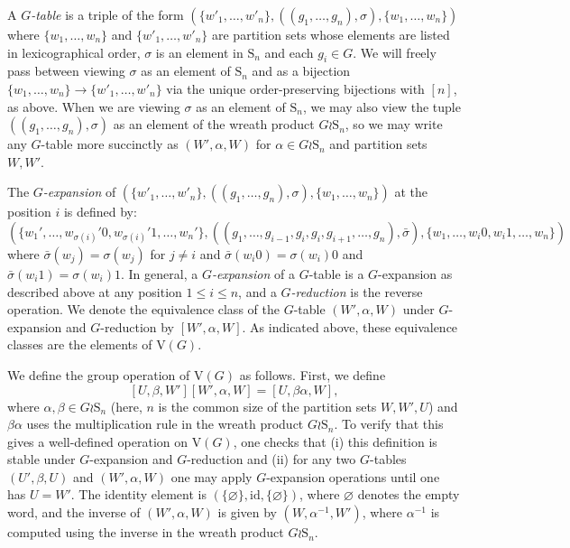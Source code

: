 \documentclass[10pt,a4paper]{amsart}
\numberwithin{equation}{section}
\numberwithin{figure}{section}
\theoremstyle{definition}
\newcommand{\V}{\mathrm{V}}
\renewcommand{\leq}{\leqslant}
\begin{document}
A \emph{$G$-table} is a triple of the form $(\{w'_1,\ldots, w'_n\} ,((g_1,\ldots,g_n),\sigma),\{w_1,\ldots,w_n\})$ where $\{w_1,\ldots,w_n\}$ and $\{w'_1,\ldots, w'_n\}$ are partition sets whose elements are listed in lexicographical order, $\sigma$ is an element in $\mathrm{S}_n$ and each $g_i \in G$. We will freely pass between viewing $\sigma$ as an element of $\mathrm{S}_n$ and as a bijection $\{w_1,\ldots,w_n\} \to \{w'_1,\ldots, w'_n\}$ via the unique order-preserving bijections with $[n]$, as above. When we are viewing $\sigma$ as an element of $\mathrm{S}_n$, we may also view the tuple $((g_1,\ldots,g_n),\sigma)$ as an element of the wreath product $G \wr \mathrm{S}_n$, so we may write any $G$-table more succinctly as $(W',\alpha,W)$ for $\alpha \in G \wr \mathrm{S}_n$ and partition sets $W,W'$.

The \emph{$G$-expansion} of $(\{w'_1,\ldots, w'_n\} ,((g_1,\ldots,g_n),\sigma),\{w_1,\ldots,w_n\})$ at the position $i$ is defined by:
\[
(\{w_1',\ldots,w_{\sigma(i)}'0, w_{\sigma(i)}'1,\ldots, w_n'\} ,((g_1,\ldots,g_{i-1},g_i,g_i,g_{i+1},\ldots,g_n),\bar\sigma),\{w_1,\ldots,w_i0,w_i1,\ldots,w_n\})
\]
where $\bar{\sigma}(w_j) = \sigma(w_j)$ for $j\neq i$ and $\bar{\sigma}(w_i 0) = \sigma(w_i)0$ and $\bar{\sigma}(w_i 1) = \sigma(w_i)1$. In general, a \emph{$G$-expansion} of a $G$-table is a $G$-expansion as described above at any position $1\leq i\leq n$, and a \emph{$G$-reduction} is the reverse operation. We denote the equivalence class of the $G$-table $(W',\alpha,W)$ under $G$-expansion and $G$-reduction by $[W',\alpha,W]$. As indicated above, these equivalence classes are the elements of $\V(G)$.

We define the group operation of $\V(G)$ as follows. First, we define
\[
[U,\beta,W'] [W',\alpha, W] = [U,\beta\alpha,W],
\]
where $\alpha,\beta \in G \wr \mathrm{S}_n$ (here, $n$ is the common size of the partition sets $W,W',U$) and $\beta\alpha$ uses the multiplication rule in the wreath product $G\wr \mathrm{S}_n$. To verify that this gives a well-defined operation on $\V(G)$, one checks that (i) this definition is stable under $G$-expansion and $G$-reduction and (ii) for any two $G$-tables $(U',\beta,U)$ and $(W',\alpha,W)$ one may apply $G$-expansion operations until one has $U=W'$. The identity element is $(\{\varnothing\},\mathrm{id},\{\varnothing\})$, where $\varnothing$ denotes the empty word, and the inverse of $(W',\alpha,W)$ is given by $(W,\alpha^{-1},W')$, where $\alpha^{-1}$ is computed using the inverse in the wreath product $G \wr \mathrm{S}_n$.
\end{document}
